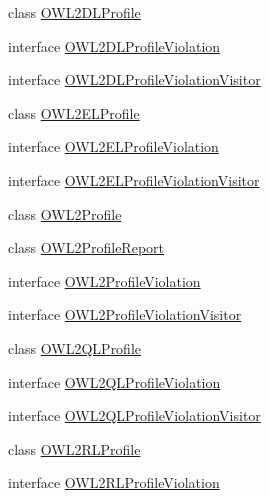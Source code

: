\begin{DoxyCompactItemize}
\item 
class \hyperlink{classorg_1_1semanticweb_1_1owlapi_1_1profiles_1_1_o_w_l2_d_l_profile}{O\-W\-L2\-D\-L\-Profile}
\item 
interface \hyperlink{interfaceorg_1_1semanticweb_1_1owlapi_1_1profiles_1_1_o_w_l2_d_l_profile_violation}{O\-W\-L2\-D\-L\-Profile\-Violation}
\item 
interface \hyperlink{interfaceorg_1_1semanticweb_1_1owlapi_1_1profiles_1_1_o_w_l2_d_l_profile_violation_visitor}{O\-W\-L2\-D\-L\-Profile\-Violation\-Visitor}
\item 
class \hyperlink{classorg_1_1semanticweb_1_1owlapi_1_1profiles_1_1_o_w_l2_e_l_profile}{O\-W\-L2\-E\-L\-Profile}
\item 
interface \hyperlink{interfaceorg_1_1semanticweb_1_1owlapi_1_1profiles_1_1_o_w_l2_e_l_profile_violation}{O\-W\-L2\-E\-L\-Profile\-Violation}
\item 
interface \hyperlink{interfaceorg_1_1semanticweb_1_1owlapi_1_1profiles_1_1_o_w_l2_e_l_profile_violation_visitor}{O\-W\-L2\-E\-L\-Profile\-Violation\-Visitor}
\item 
class \hyperlink{classorg_1_1semanticweb_1_1owlapi_1_1profiles_1_1_o_w_l2_profile}{O\-W\-L2\-Profile}
\item 
class \hyperlink{classorg_1_1semanticweb_1_1owlapi_1_1profiles_1_1_o_w_l2_profile_report}{O\-W\-L2\-Profile\-Report}
\item 
interface \hyperlink{interfaceorg_1_1semanticweb_1_1owlapi_1_1profiles_1_1_o_w_l2_profile_violation}{O\-W\-L2\-Profile\-Violation}
\item 
interface \hyperlink{interfaceorg_1_1semanticweb_1_1owlapi_1_1profiles_1_1_o_w_l2_profile_violation_visitor}{O\-W\-L2\-Profile\-Violation\-Visitor}
\item 
class \hyperlink{classorg_1_1semanticweb_1_1owlapi_1_1profiles_1_1_o_w_l2_q_l_profile}{O\-W\-L2\-Q\-L\-Profile}
\item 
interface \hyperlink{interfaceorg_1_1semanticweb_1_1owlapi_1_1profiles_1_1_o_w_l2_q_l_profile_violation}{O\-W\-L2\-Q\-L\-Profile\-Violation}
\item 
interface \hyperlink{interfaceorg_1_1semanticweb_1_1owlapi_1_1profiles_1_1_o_w_l2_q_l_profile_violation_visitor}{O\-W\-L2\-Q\-L\-Profile\-Violation\-Visitor}
\item 
class \hyperlink{classorg_1_1semanticweb_1_1owlapi_1_1profiles_1_1_o_w_l2_r_l_profile}{O\-W\-L2\-R\-L\-Profile}
\item 
interface \hyperlink{interfaceorg_1_1semanticweb_1_1owlapi_1_1profiles_1_1_o_w_l2_r_l_profile_violation}{O\-W\-L2\-R\-L\-Profile\-Violation}

\end{DoxyCompactItemize}
